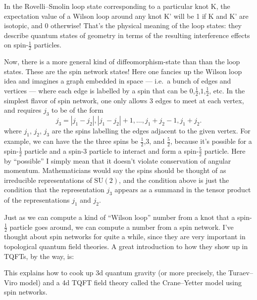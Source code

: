 \documentclass[12pt]{article}
\def\tightlist{}
\renewcommand{\texttt}[1]{%
  \begingroup
  \ttfamily
  \begingroup\lccode`~=`/\lowercase{\endgroup\def~}{/\discretionary{}{}{}}%
  \begingroup\lccode`~=`[\lowercase{\endgroup\def~}{[\discretionary{}{}{}}%
  \begingroup\lccode`~=`.\lowercase{\endgroup\def~}{.\discretionary{}{}{}}%
  \catcode`/=\active\catcode`[=\active\catcode`.=\active
  \scantokens{#1\noexpand}%
  \endgroup
}
\begin{document}
In the Rovelli--Smolin loop state corresponding to a particular knot
K, the expectation value of a Wilson loop around any knot K' will be 1
if K and K' are isotopic, and 0 otherwise! That's the physical meaning
of the loop states: they describe quantum states of geometry in terms of
the resulting interference effects on spin-\(\frac12\) particles.

Now, there is a more general kind of diffeomorphism-state than than the
loop states. These are the spin network states! Here one fancies up the
Wilson loop idea and imagines a graph embedded in space --- i.e.~a bunch
of edges and vertices --- where each edge is labelled by a spin that can
be \(0\),\(\frac{1}{2}\),\(1\),\(\frac{1}{2}\), etc. In the simplest flavor of spin
network, one only allows 3 edges to meet at each vertex, and requires
\(j_3\) to be of the form
\[j_3 = |j_1-j_2|, |j_1-j_2| + 1, \ldots, j_1+j_2-1, j_1+j_2.\] where
\(j_1\), \(j_2\), \(j_3\) are the spins labelling the edges adjacent to
the given vertex. For example, we can have the the three spins be
\(\frac{1}{2}\),\(3\), and \(\frac{5}{2}\), because it's possible for a spin-\(\frac12\)
particle and a spin-3 particle to interact and form a spin-\(\frac{5}{2}\)
particle. Here by ``possible'' I simply mean that it doesn't violate
conservation of angular momentum. Mathematicians would say the spins
should be thought of as irreducible representations of
\(\mathrm{SU}(2)\), and the condition above is just the condition that
the representation \(j_3\) appears as a summand in the tensor product of
the representations \(j_1\) and \(j_2\).

Just as we can compute a kind of ``Wilson loop'' number from a knot that
a spin-\(\frac12\) particle goes around, we can compute a number from a
spin network. I've thought about spin networks for quite a while, since
they are very important in topological quantum field theories. A great
introduction to how they show up in TQFTs, by the way, is:

\noindent
This explains how to cook up 3d quantum gravity (or more precisely, the
Turaev--Viro model) and a 4d TQFT field theory called the Crane--Yetter
model using spin networks.
\end{document}

